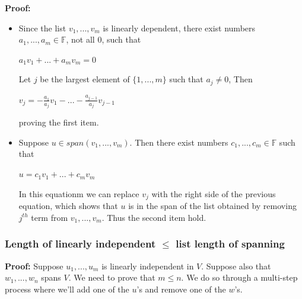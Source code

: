 \documentclass{report}
\begin{document}
\textbf{Proof: }\newline
\begin{itemize}
    \item Since the list $v_1,...,v_m$ is linearly dependent, there exist numbers $a_1,...,a_m \in \mathbb{F}$, not all 0, such that\newline
            \centerline{$a_1v_1+...+a_mv_m=0$}\newline\newline
          Let $j$ be the largest element of $\{1,...,m\}$ such that $a_j \neq 0$, Then\newline\newline
            \centerline{$v_j = -\frac{a_1}{a_j}v_1-...-\frac{a_{j-1}}{a_j}v_{j-1}$}\newline\newline
          proving the first item.
             
    \item Suppose $u \in span(v_1,...,v_m)$. Then there exist numbers $c_1,...,c_m \in \mathbb{F}$ such that\newline\newline
              \centerline{$u=c_1v_1+...+c_mv_m$}\newline\newline
          In this equationm we can replace $v_j$ with the right side of the previous equation, which shows that $u$ is in the span of the list obtained by removing $j^{th}$ term from $v_1,...,v_m$. Thus the second item hold.
\end{itemize}

\subsubsection{Length of linearly independent $\leq$ list length of spanning}


\textbf{Proof:}\newline
Suppose $u_1,...,u_m$ is linearly independent in $V$.\newline
Suppose also that $w_1,...,w_n$ spans $V$.\newline
We need to prove that $m \leq n$.\newline
We do so through a multi-step process where we'll add one of the $u$'s and remove one of the $w$'s.\newline
\end{document}
